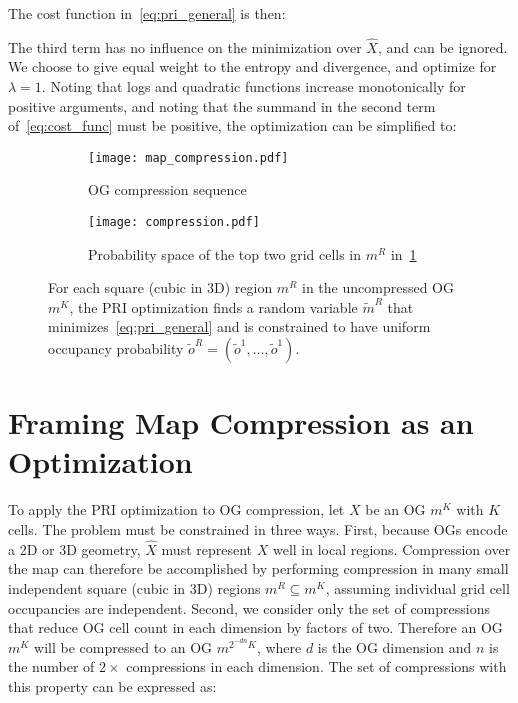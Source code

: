 The cost function in~\eqref{eq:pri_general} is then:
%

The third term has no influence on the minimization over $\hat{X}$, and can be ignored. We
choose to give equal weight to the entropy and divergence, and optimize for $\lambda=1$.
Noting that logs and quadratic functions increase monotonically for positive arguments,
and noting that the summand in the second term of~\eqref{eq:cost_func} must be positive,
the optimization can be simplified to:
%

\begin{figure}
    \centering
    \begin{subfigure}[t]{0.45\textwidth}
        \centering
        \texttt{[image: map\_compression.pdf]}
        \caption{OG compression sequence \label{fig:pri_compression1}}
    \end{subfigure}
    \hfill
    \begin{subfigure}[t]{0.45\textwidth}
        \centering
        \texttt{[image: compression.pdf]}
        \caption{Probability space of the top two grid cells
        in $m^{R}$ in~\ref{fig:pri_compression1} \label{fig:pri_compression2}}
    \end{subfigure}
    \caption{For each square (cubic in 3D) region $m^{R}$ in the uncompressed OG $m^{K}$,
    the PRI optimization finds a random variable $\tilde{m}^{R}$ that
    minimizes~\eqref{eq:pri_general} and is constrained to have uniform occupancy
    probability $\tilde{o}^{R} = (\tilde{o}^{1}, \dots, \tilde{o}^{1})$.
  \label{fig:pri_compression}}
\end{figure}


\section{Framing Map Compression as an Optimization}

To apply the PRI optimization to OG compression, let $X$ be an OG $m^{K}$ with $K$ cells.
The problem must be constrained in three ways. First, because OGs encode a 2D or 3D geometry,
$\hat{X}$ must represent $X$ well in local regions. Compression over the map can therefore
be accomplished by performing compression in many small independent square (cubic in 3D)
regions $m^{R} \subseteq m^{K}$, assuming individual grid cell occupancies are independent.
Second, we consider only the set of compressions that reduce OG cell count in each dimension
by factors of two. Therefore an OG $m^{K}$ will be compressed to an OG $m^{2^{-dn}K}$, where
$d$ is the OG dimension and $n$ is the number of $2\times$ compressions in each dimension. The
set of compressions with this property can be expressed as:
%

